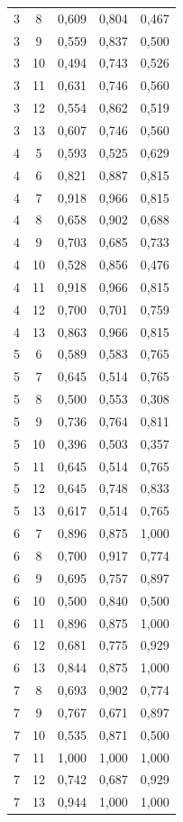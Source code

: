 \documentclass[12pt,a4paper,oneside]{report}
\begin{document}
\begin{longtable}{ccccc}
3 & 8 & 0,609 & 0,804 & 0,467 \\
3 & 9 & 0,559 & 0,837 & 0,500 \\
3 & 10 & 0,494 & 0,743 & 0,526 \\
3 & 11 & 0,631 & 0,746 & 0,560 \\
3 & 12 & 0,554 & 0,862 & 0,519 \\
3 & 13 & 0,607 & 0,746 & 0,560 \\
4 & 5 & 0,593 & 0,525 & 0,629 \\
4 & 6 & 0,821 & 0,887 & 0,815 \\
4 & 7 & 0,918 & 0,966 & 0,815 \\
4 & 8 & 0,658 & 0,902 & 0,688 \\
4 & 9 & 0,703 & 0,685 & 0,733 \\
4 & 10 & 0,528 & 0,856 & 0,476 \\
4 & 11 & 0,918 & 0,966 & 0,815 \\
4 & 12 & 0,700 & 0,701 & 0,759 \\
4 & 13 & 0,863 & 0,966 & 0,815 \\
5 & 6 & 0,589 & 0,583 & 0,765 \\
5 & 7 & 0,645 & 0,514 & 0,765 \\
5 & 8 & 0,500 & 0,553 & 0,308 \\
5 & 9 & 0,736 & 0,764 & 0,811 \\
5 & 10 & 0,396 & 0,503 & 0,357 \\
5 & 11 & 0,645 & 0,514 & 0,765 \\
5 & 12 & 0,645 & 0,748 & 0,833 \\
5 & 13 & 0,617 & 0,514 & 0,765 \\
6 & 7 & 0,896 & 0,875 & 1,000 \\
6 & 8 & 0,700 & 0,917 & 0,774 \\
6 & 9 & 0,695 & 0,757 & 0,897 \\
6 & 10 & 0,500 & 0,840 & 0,500 \\
6 & 11 & 0,896 & 0,875 & 1,000 \\
6 & 12 & 0,681 & 0,775 & 0,929 \\
6 & 13 & 0,844 & 0,875 & 1,000 \\
7 & 8 & 0,693 & 0,902 & 0,774 \\
7 & 9 & 0,767 & 0,671 & 0,897 \\
7 & 10 & 0,535 & 0,871 & 0,500 \\
7 & 11 & 1,000 & 1,000 & 1,000 \\
7 & 12 & 0,742 & 0,687 & 0,929 \\
7 & 13 & 0,944 & 1,000 & 1,000 \\

\end{longtable}
\end{document}
